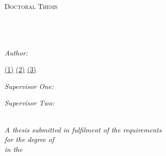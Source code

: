 \documentclass[11pt, oneside]{Thesis} %
\begin{document}
\begin{titlepage}
\begin{center}

\textsc{\LARGE \univname}\\[1.5cm] %
\textsc{\LARGE \univnameb}\\[1.5cm] %
\textsc{\Large Doctoral Thesis}\\[0.5cm] %

\HRule \\[0.4cm] %
{\huge \bfseries \ttitle}\\[0.4cm] %
\HRule \\[1.5cm] %
 
\begin{minipage}{0.4\textwidth}
\begin{flushleft} \large
\emph{Author:}\\
\authornames %
\end{flushleft} \large
\begin{flushleft} \large
\href{\authorlinka}{(1)} %
\href{\authorlinkb}{(2)} %
\href{\authorlinkc}{(3)} %
\end{flushleft}
\end{minipage}
\begin{minipage}{0.4\textwidth}
\begin{flushright} \large
\emph{Supervisor One:} \\
\href{\suplinka}{\supnamea} %
\end{flushright}
\begin{flushright} \large
\emph{Supervisor Two:} \\
\href{\suplinkb}{\supnameb} %
\end{flushright}
\end{minipage}\\[3cm]
 
\large \textit{A thesis submitted in fulfilment of the requirements\\ for the degree of \degreename}\\[0.3cm] %
\textit{in the}\\[0.4cm]
\groupname\\\deptname\\[2cm] %
 

\end{center}
\end{titlepage}
\end{document}
